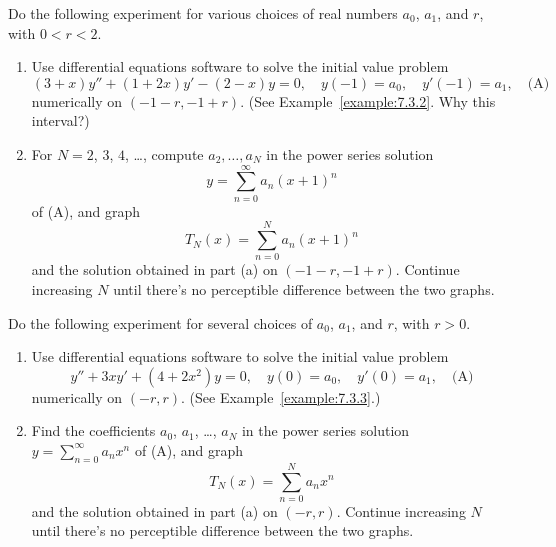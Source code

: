 \documentclass{ximera}
\begin{document}
\begin{problem}\label{exer:7.3.14}
Do the following experiment for various choices of
real numbers  $a_0$, $a_1$, and $r$, with $0<r<2$.
\begin{enumerate}
\item %
Use  differential equations software  to solve the initial
value problem
$$
(3+x)y''+(1+2x)y'-(2-x)y=0,\quad y(-1)=a_0,\quad y'(-1)=a_1,\quad
\text{(A)}
$$
numerically on $(-1-r,-1+r)$.  (See Example~\ref{example:7.3.2}. Why this
interval?)
\item %
For $N=2$, $3$, $4$, \dots, compute $a_2,\dots,a_N$ in the power series
solution
$$
y=\sum_{n=0}^\infty a_n(x+1)^n
$$
 of (A), and graph
$$
T_N(x)=\sum_{n=0}^N a_n(x+1)^n
$$
and the solution obtained in part (a) on $(-1-r,-1+r)$.
Continue increasing $N$ until there's no perceptible
difference between the two graphs.
\end{enumerate}
\end{problem}

\begin{problem}\label{exer:7.3.15}
Do the following experiment for several choices of $a_0$,
 $a_1$, and $r$, with $r>0$.
\begin{enumerate}
\item %
Use  differential equations software to solve the initial
value problem
$$
y''+3xy'+(4+2x^2)y=0,\quad y(0)=a_0,\quad y'(0)=a_1,\quad
\text{(A)}
$$
numerically on $(-r,r)$. (See Example~\ref{example:7.3.3}.)
\item %
Find the coefficients $a_0$, $a_1$, \dots, $a_N$
in the power series solution $y=\sum_{n=0}^\infty a_nx^n$ of (A), and
graph
$$
T_N(x)=\sum_{n=0}^N a_nx^n
$$
and the solution obtained in part (a) on $(-r,r)$.
Continue increasing $N$ until there's no perceptible
difference between the two graphs.
\end{enumerate}
\end{problem}
\end{document}

